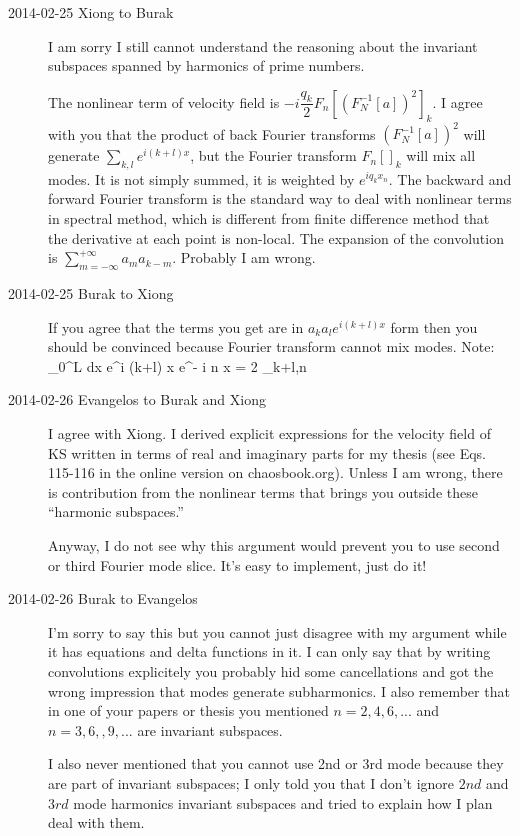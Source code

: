\begin{description}
\item[2014-02-25 Xiong to Burak] I am sorry I still cannot
understand the reasoning about the invariant subspaces spanned by
harmonics of prime numbers.

The nonlinear term of velocity field is
$-i\dfrac{q_k}{2}F_{n}[(F_N^{-1}[a])^2]_k$. I agree with you that
the product of back Fourier transforms $(F_N^{-1}[a])^2$ will
generate $\sum_{k,l} e^{i (k+l) x}$, but the Fourier transform
$F_{n}[]_k$ will mix all modes. It is not simply summed, it is weighted
by $e^{iq_{k}x_{n}}$. The backward and forward Fourier
transform is the standard way to deal with nonlinear terms in spectral
method, which is different from finite difference method that the
derivative at each point is non-local. The expansion of the convolution is
$\sum_{m=-\infty}^{+\infty}a_{m}a_{k-m}$. Probably I am wrong.

\item[2014-02-25 Burak to Xiong] If you agree that the terms you get are
in $a_k a_l e^{i (k+l) x}$ form then you should be convinced because Fourier
transform cannot mix modes. Note:
\beq
 \int_0^L dx e^{i (k+l) x} e^{- i n x} = 2 \pi \delta_{k+l,n}
\eeq

\item[2014-02-26 Evangelos to Burak and Xiong] I agree with Xiong.
I derived explicit expressions for the velocity field of KS written in terms
of real and imaginary parts for my thesis (see Eqs. 115-116 in the online version
on chaosbook.org). Unless I am wrong, there is contribution from
the nonlinear terms that brings you outside these ``harmonic subspaces.''

Anyway, I do not see why this argument would prevent you to use second or third
Fourier mode slice. It's easy to implement, just do it!


\item[2014-02-26 Burak to Evangelos] I'm sorry to say this but you cannot
just disagree with my argument while it has equations and delta functions
in it. I can only say that by writing convolutions explicitely you probably
hid some cancellations and got the wrong impression that modes generate
subharmonics. I also remember that in one of your papers or thesis you
mentioned $n=2,4,6,...$ and $n=3,6,,9,...$ are invariant subspaces.

I also never mentioned that you cannot use 2nd or 3rd mode because they are
part of invariant subspaces; I only told you that I don't ignore $2nd$ and
$3rd$ mode harmonics invariant subspaces and tried to explain how I plan
deal with them.


\end{description}
